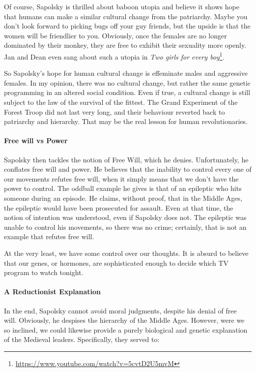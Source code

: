 Of course, Sapolsky is thrilled about baboon utopia and believe it shows hope that humans can make a similar cultural change from the patriarchy. Maybe you don't look forward to picking bugs off your guy friends, but the upside is that the women will be friendlier to you. Obviously, once the females are no longer dominated by their monkey, they are free to exhibit their sexuality more openly. Jan and Dean even sang about such a utopia in \textit{Two girls for every boy}\footnote{\url{https://www.youtube.com/watch?v=5cvtD2U5mvM}}.

So Sapolsky's hope for human cultural change is effeminate males and aggressive females. In my opinion, there was no cultural change, but rather the same genetic programming in an altered social condition. Even if true, a cultural change is still subject to the law of the survival of the fittest. The Grand Experiment of the Forest Troop did not last very long, and their behaviour reverted back to patriarchy and hierarchy. That may be the real lesson for human revolutionaries.

\paragraph{Free will vs Power}


Sapolsky then tackles the notion of Free Will, which he denies. Unfortunately, he conflates free will and power. He believes that the inability to control every one of our movements refutes free will, when it simply means that we don't have the power to control. The oddball example he gives is that of an epileptic who hits someone during an episode. He claims, without proof, that in the Middle Ages, the epileptic would have been prosecuted for assault. Even at that time, the notion of intention was understood, even if Sapolsky does not. The epileptic was unable to control his movements, so there was no crime; certainly, that is not an example that refutes free will.

At the very least, we have some control over our thoughts. It is absurd to believe that our genes, or hormones, are sophisticated enough to decide which TV program to watch tonight.

\paragraph{A Reductionist Explanation}


In the end, Sapolsky cannot avoid moral judgments, despite his denial of free will. Obviously, he despises the hierarchy of the Middle Ages. However, were we so inclined, we could likewise provide a purely biological and genetic explanation of the Medieval leaders. Specifically, they served to:


